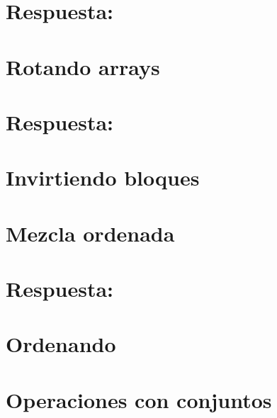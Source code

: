 \section*{Respuesta:}

\fi

\section{Rotando arrays}

\ifshowanswers
\section*{Respuesta:}

\fi

\section{Invirtiendo bloques}


\section{Mezcla ordenada}

\ifshowanswers
\section*{Respuesta:}

\fi

\section{Ordenando}


\section{Operaciones con conjuntos}
